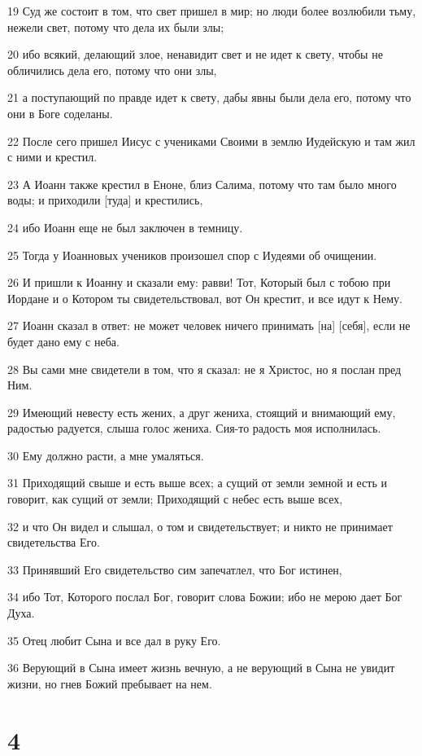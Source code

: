 \par 19 Суд же состоит в том, что свет пришел в мир; но люди более возлюбили тьму, нежели свет, потому что дела их были злы;
\par 20 ибо всякий, делающий злое, ненавидит свет и не идет к свету, чтобы не обличились дела его, потому что они злы,
\par 21 а поступающий по правде идет к свету, дабы явны были дела его, потому что они в Боге соделаны.
\par 22 После сего пришел Иисус с учениками Своими в землю Иудейскую и там жил с ними и крестил.
\par 23 А Иоанн также крестил в Еноне, близ Салима, потому что там было много воды; и приходили [туда] и крестились,
\par 24 ибо Иоанн еще не был заключен в темницу.
\par 25 Тогда у Иоанновых учеников произошел спор с Иудеями об очищении.
\par 26 И пришли к Иоанну и сказали ему: равви! Тот, Который был с тобою при Иордане и о Котором ты свидетельствовал, вот Он крестит, и все идут к Нему.
\par 27 Иоанн сказал в ответ: не может человек ничего принимать [на] [себя], если не будет дано ему с неба.
\par 28 Вы сами мне свидетели в том, что я сказал: не я Христос, но я послан пред Ним.
\par 29 Имеющий невесту есть жених, а друг жениха, стоящий и внимающий ему, радостью радуется, слыша голос жениха. Сия-то радость моя исполнилась.
\par 30 Ему должно расти, а мне умаляться.
\par 31 Приходящий свыше и есть выше всех; а сущий от земли земной и есть и говорит, как сущий от земли; Приходящий с небес есть выше всех,
\par 32 и что Он видел и слышал, о том и свидетельствует; и никто не принимает свидетельства Его.
\par 33 Принявший Его свидетельство сим запечатлел, что Бог истинен,
\par 34 ибо Тот, Которого послал Бог, говорит слова Божии; ибо не мерою дает Бог Духа.
\par 35 Отец любит Сына и все дал в руку Его.
\par 36 Верующий в Сына имеет жизнь вечную, а не верующий в Сына не увидит жизни, но гнев Божий пребывает на нем.

\chapter{4}

